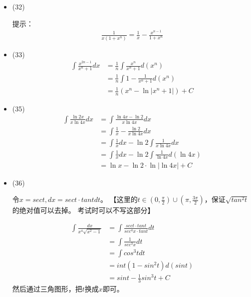 \documentclass{article}
\begin{document}
\begin{itemize}
  \item (32)

        提示：
        \begin{align*}
          \frac{1}{x(1 + x^n)} = \frac{1}{x} - \frac{x^{n - 1}}{1 + x^n}
        \end{align*}

  \item (33)
        \begin{align*}
          \int \frac{x^{2n - 1}}{x^n + 1} dx
           & = \frac{1}{n} \int \frac{x^{n}}{x^n + 1} d(x^n) \\
           & = \frac{1}{n} \int 1 - \frac{1}{x^n + 1} d(x^n) \\
           & = \frac{1}{n} (x^n - \ln |x^n + 1|) + C
        \end{align*}

  \item (35)
        \begin{align*}
          \int \frac{\ln 2x}{x \ln 4x} dx
           & = \int \frac{\ln 4x - \ln 2}{x \ln 4x} dx                     \\
           & = \int \frac{1}{x} - \frac{\ln 2}{x \ln 4x} dx                \\
           & = \int \frac{1}{x} dx - \ln 2 \int \frac{1}{x \ln 4x} dx      \\
           & = \int \frac{1}{x} dx - \ln 2 \int \frac{1}{\ln 4x} d(\ln 4x) \\
           & = \ln x - \ln 2 \cdot \ln |\ln 4x| + C
        \end{align*}

  \item (36)

        令$x = sec t, dx = sect \cdot tan t dt$。
        【这里的$t \in (0, \frac{\pi}{2}) \cup (\pi, \frac{3\pi}{2})$，保证$\sqrt{tan^2 t}$的绝对值可以去掉。
        考试时可以不写这部分】

        \begin{align*}
          \int \frac{dx}{x^4 \sqrt{x^2 - 1}}
           & = \int \frac{sec t \cdot tan t }{sec^4 x \cdot tan t} dt \\
           & = \int \frac{1}{sec^3 x} dt                              \\
           & = \int cos^3 t dt                                        \\
           & = int (1 - sin^2 t) d(sin t)                             \\
           & = sin t - \frac{1}{3} sin^3 t + C
        \end{align*}
        然后通过三角图形，把$t$换成$x$即可。
\end{itemize}
\end{document}
